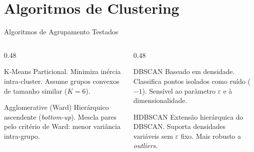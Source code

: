 \documentclass[aspectratio=169]{beamer}
\begin{document}
\section{Algoritmos de Clustering}
\begin{frame}{Algoritmos de Agrupamento Testados}
  \begin{columns}[T]
    \begin{column}{0.48\textwidth}
      \begin{block}{K-Means}
        \small Particional. Minimiza inércia intra-cluster.
        Assume grupos convexos de tamanho similar ($K=6$).
      \end{block}
      \vspace{0.4em}
      \begin{block}{Agglomerative (Ward)}
        \small Hierárquico ascendente (\textit{bottom-up}).
        Mescla pares pelo critério de Ward: menor variância intra-grupo.
      \end{block}
    \end{column}
    \begin{column}{0.48\textwidth}
      \begin{block}{DBSCAN}
        \small Baseado em densidade. Classifica pontos isolados como
        ruído ($-1$). Sensível ao parâmetro $\varepsilon$ e à
        dimensionalidade.
      \end{block}
      \vspace{0.4em}
      \begin{block}{HDBSCAN}
        \small Extensão hierárquica do DBSCAN. Suporta densidades
        variáveis sem $\varepsilon$ fixo. Mais robusto a \textit{outliers}.
      \end{block}
    \end{column}
  \end{columns}
\end{frame}

\end{document}
